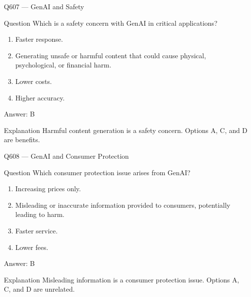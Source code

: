 \documentclass[aspectratio=169,8pt]{beamer}
\begin{document}
	\begin{frame}{Q607 --- GenAI and Safety}
		\begin{block}{Question}
			Which is a safety concern with GenAI in critical applications?
			\begin{enumerate}
				\item Faster response.
				\item Generating unsafe or harmful content that could cause physical, psychological, or financial harm.
				\item Lower costs.
				\item Higher accuracy.
			\end{enumerate}
		\end{block}
		\begin{exampleblock}{Answer: B}\end{exampleblock}
		\begin{block}{Explanation}
			Harmful content generation is a safety concern. Options A, C, and D are benefits.
		\end{block}
	\end{frame}
	
	\begin{frame}{Q608 --- GenAI and Consumer Protection}
		\begin{block}{Question}
			Which consumer protection issue arises from GenAI?
			\begin{enumerate}
				\item Increasing prices only.
				\item Misleading or inaccurate information provided to consumers, potentially leading to harm.
				\item Faster service.
				\item Lower fees.
			\end{enumerate}
		\end{block}
		\begin{exampleblock}{Answer: B}\end{exampleblock}
		\begin{block}{Explanation}
			Misleading information is a consumer protection issue. Options A, C, and D are unrelated.
		\end{block}
	\end{frame}
	
\end{document}
